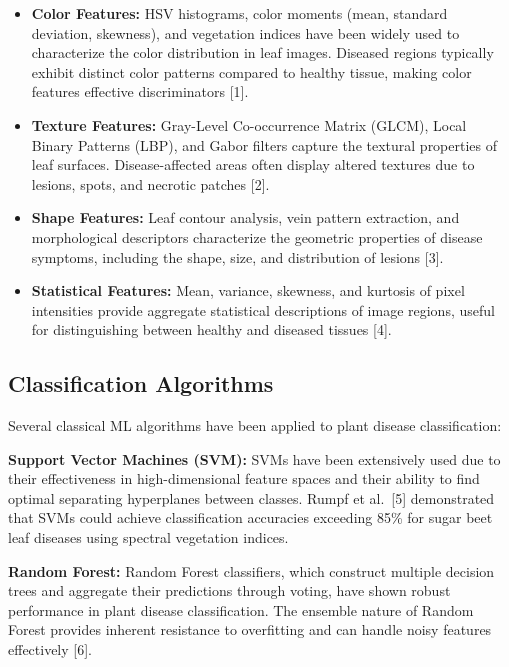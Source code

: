 \documentclass[12pt]{report}
\begin{document}
\begin{itemize}[leftmargin=*]
\item \textbf{Color Features:} HSV histograms, color moments (mean, standard deviation, skewness), and vegetation indices have been widely used to characterize the color distribution in leaf images. Diseased regions typically exhibit distinct color patterns compared to healthy tissue, making color features effective discriminators [1].

\item \textbf{Texture Features:} Gray-Level Co-occurrence Matrix (GLCM), Local Binary Patterns (LBP), and Gabor filters capture the textural properties of leaf surfaces. Disease-affected areas often display altered textures due to lesions, spots, and necrotic patches [2].

\item \textbf{Shape Features:} Leaf contour analysis, vein pattern extraction, and morphological descriptors characterize the geometric properties of disease symptoms, including the shape, size, and distribution of lesions [3].

\item \textbf{Statistical Features:} Mean, variance, skewness, and kurtosis of pixel intensities provide aggregate statistical descriptions of image regions, useful for distinguishing between healthy and diseased tissues [4].
\end{itemize}

\subsection{Classification Algorithms}

Several classical ML algorithms have been applied to plant disease classification:

\textbf{Support Vector Machines (SVM):} SVMs have been extensively used due to their effectiveness in high-dimensional feature spaces and their ability to find optimal separating hyperplanes between classes. Rumpf et al.\ [5] demonstrated that SVMs could achieve classification accuracies exceeding 85\% for sugar beet leaf diseases using spectral vegetation indices.

\textbf{Random Forest:} Random Forest classifiers, which construct multiple decision trees and aggregate their predictions through voting, have shown robust performance in plant disease classification. The ensemble nature of Random Forest provides inherent resistance to overfitting and can handle noisy features effectively [6].
\end{document}
